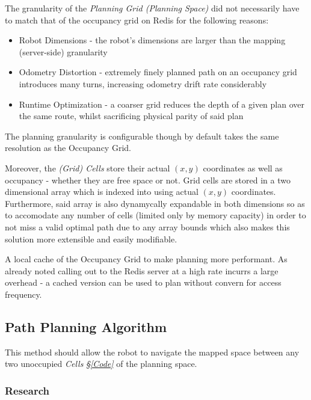 \documentclass[11pt, a4paper]{article}
\begin{document}
The granularity of the \textit{Planning Grid (Planning Space)} did not necessarily have to match that 
of the occupancy grid on Redis for the following reasons:

\begin{itemize}

	\item Robot Dimensions     - the robot's dimensions are larger than the mapping (server-side) 
granularity
	\item Odometry Distortion  - extremely finely planned path on an occupancy grid introduces many 
turns, increasing odometry drift rate considerably \cite{task2_report}
	\item Runtime Optimization - a coarser grid reduces the depth of a given plan over the same route,
whilst sacrificing physical parity of said plan

\end{itemize}

The planning granularity is configurable though by default takes the same resolution as the Occupancy Grid.

Moreover, the \textit{(Grid) Cells} store their actual $(x ,y)$ coordinates as well as occupancy - whether 
they are free space or not. Grid cells are stored in a two dimensional array which is indexed into using 
actual $(x ,y)$ coordinates. Furthermore, said array is also dynamycally expandable in both dimensions so
as to accomodate any number of cells (limited only by memory capacity) in order to not miss a valid 
optimal path due to any array bounds which also makes this solution more extensible and easily modifiable.

A local cache of the Occupancy Grid to make planning more performant. As already noted calling out to 
the Redis server at a high rate incurrs a large overhead - a cached version can be used to plan
without convern for access frequency.




\subsection{Path Planning Algorithm}
\label{Path_Planning_Algorithm}

This method should allow the robot to navigate the mapped space between any two unoccupied \textit{Cells} \textit{\S\ref{Code}} of the planning space.

\subsubsection{Research}
\end{document}
